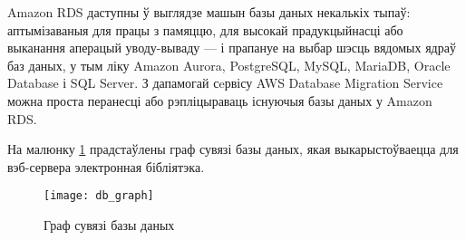 Amazon RDS даступны ў выглядзе машын базы даных некалькіх тыпаў: аптымізаваныя для працы з памяццю, для высокай прадукцыйнасці або выканання аперацый уводу-вываду --- і прапануе на выбар шэсць вядомых ядраў баз даных, у тым ліку Amazon Aurora, PostgreSQL, MySQL, MariaDB, Oracle Database і SQL Server. З дапамогай сeрвісу AWS Database Migration Service можна проста перанесці або рэпліцыраваць існуючыя базы даных у Amazon RDS.

На малюнку \ref{img: DB graph} прадстаўлены граф сувязі базы даных, якая выкарыстоўваецца для вэб-сервера электронная бібліятэка.

\newpage

\begin{figure}[h!]
    \centering
    \texttt{[image: db\_graph]}
    \caption{Граф сувязі базы даных}
    \label{img: DB graph} 
\end{figure}

